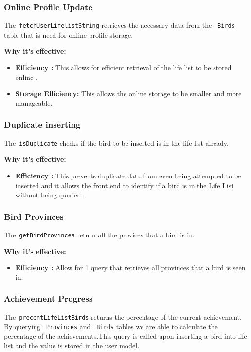 \documentclass{article}
\begin{document}
\subsubsection{Online Profile Update}
The\texttt{\ fetchUserLifelistString} retrieves the necessary data from the \texttt{\ Birds} table that is need for online profile storage.

\textbf{Why it's effective:}
\begin{itemize}
    \item \textbf{Efficiency :} This allows for efficient retrieval of the life list to be stored online .
    \item \textbf{Storage Efficiency:} This allows the online storage to be smaller and more manageable.
\end{itemize}

\subsubsection{Duplicate inserting}
The\texttt{\ isDuplicate} checks if the bird to be inserted is in the life list already.

\textbf{Why it's effective:}
\begin{itemize}
    \item \textbf{Efficiency :} This prevents duplicate data from even being attempted to be inserted and it allows the front end to identify if a bird is in the Life List without being queried.
\end{itemize}

\subsubsection{Bird Provinces}
The\texttt{\ getBirdProvinces} return all the provices that a bird is in.

\textbf{Why it's effective:}
\begin{itemize}
    \item \textbf{Efficiency :} Allow for 1 query that retrieves all provinces that a bird is seen in.
\end{itemize}

\subsubsection{Achievement Progress}
The\texttt{\ precentLifeListBirds} returns the percentage of the current achievement. By querying \texttt{\ Provinces} and \texttt{\ Birds} tables we are able to calculate the percentage of the achievements.This query is called upon inserting a bird into life list and the value is stored in the user model.
\end{document}

